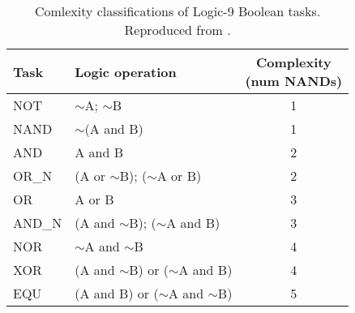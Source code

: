 \begin{table}[h]
\centering
\caption{Comlexity classifications of Logic-9 Boolean tasks. Reproduced from \citep{lenski2003evolutionary}.}
\begin{tabular}{llc}
\hline
Task & Logic operation & \makecell{Complexity\\(num NANDs)} \\
\hline
NOT & $\sim$A; $\sim$B & 1 \\
NAND & $\sim$(A and B) & 1 \\
AND & A and B & 2 \\
OR\_N & (A or $\sim$B); ($\sim$A or B) & 2 \\
OR & A or B & 3 \\
AND\_N & (A and $\sim$B); ($\sim$A and B) & 3 \\
NOR & $\sim$A and $\sim$B & 4 \\
XOR & (A and $\sim$B) or ($\sim$A and B) & 4 \\
EQU & (A and B) or ($\sim$A and $\sim$B) & 5 \\
\hline
\end{tabular}
\end{table}
